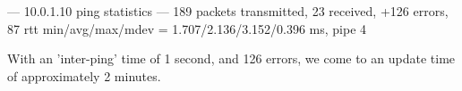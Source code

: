 --- 10.0.1.10 ping statistics ---
189 packets transmitted, 23 received, +126 errors, 87%
rtt min/avg/max/mdev = 1.707/2.136/3.152/0.396 ms, pipe 4


With an 'inter-ping' time of 1 second, and 126 errors, we come to an update time of approximately 2 minutes.
